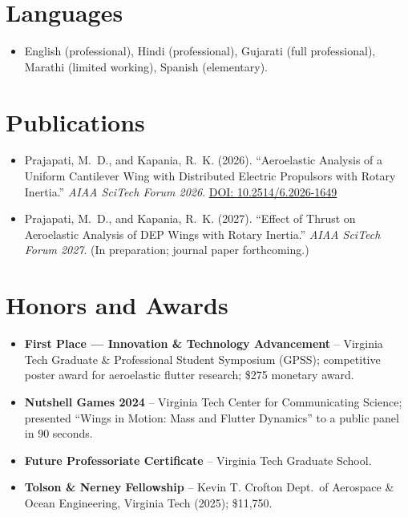 \documentclass[11pt,a4paper]{moderncv}
\begin{document}

\section{Languages}
\vspace{1pt}
\begin{itemize}
\item English (professional), Hindi (professional), Gujarati (full professional), Marathi (limited working), Spanish (elementary).
\end{itemize}


\section{Publications}
\vspace{1pt}
\begin{itemize}
\item Prajapati, M.~D., and Kapania, R.~K. (2026). ``Aeroelastic Analysis of a Uniform Cantilever Wing with Distributed Electric Propulsors with Rotary Inertia.'' \textit{AIAA SciTech Forum 2026}. \href{https://doi.org/10.2514/6.2026-1649}{DOI: 10.2514/6.2026-1649}
\item Prajapati, M.~D., and Kapania, R.~K. (2027). ``Effect of Thrust on Aeroelastic Analysis of DEP Wings with Rotary Inertia.'' \textit{AIAA SciTech Forum 2027}. (In preparation; journal paper forthcoming.)
\end{itemize}


\section{Honors and Awards}
\vspace{1pt}
\begin{itemize}
\item{\textbf{First Place --- Innovation \& Technology Advancement} -- Virginia Tech Graduate \& Professional Student Symposium (GPSS); competitive poster award for aeroelastic flutter research; \$275 monetary award.}
\item{\textbf{Nutshell Games 2024} -- Virginia Tech Center for Communicating Science; presented ``Wings in Motion: Mass and Flutter Dynamics'' to a public panel in 90 seconds.}
\item{\textbf{Future Professoriate Certificate} -- Virginia Tech Graduate School.}
\item{\textbf{Tolson \& Nerney Fellowship} -- Kevin T. Crofton Dept.\ of Aerospace \& Ocean Engineering, Virginia Tech (2025); \$11,750.}
\end{itemize}
\end{document}
